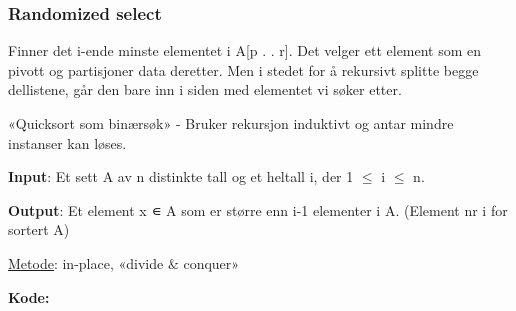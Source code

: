 \documentclass[12pt]{report}
\begin{document}
\vspace{\baselineskip}

\vspace{\baselineskip}

\vspace{\baselineskip}\subsubsection*{Randomized select}
Finner det i-ende minste elementet i A[p . . r]. Det velger ett element som en pivott og partisjoner data deretter. Men i stedet for å rekursivt splitte begge dellistene, går den bare inn i siden med elementet vi søker etter.\par

«Quicksort som binærsøk» - Bruker rekursjon induktivt og antar mindre instanser kan løses.\par


\vspace{\baselineskip}
\textbf{Input}: Et sett A av n distinkte tall og et heltall i, der 1 $ \leq $  i $ \leq $  n.\par

\textbf{Output}: Et element x ∊ A som er større enn i-1 elementer i A. (Element nr i for sortert A)\par


\vspace{\baselineskip}
\uline{Metode}: in-place, «divide $\&$  conquer»\par


\vspace{\baselineskip}
\textbf{Kode: }\par
\end{document}
